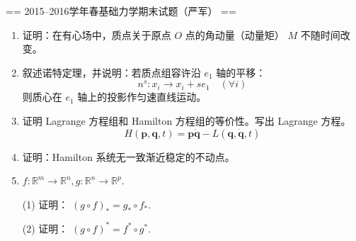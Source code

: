 == 2015--2016学年春基础力学期末试题（严军） ==

\begin{enumerate}
\item 证明：在有心场中，质点关于原点 $O$ 点的角动量（动量矩） $M$ 不随时间改变。

\item 叙述诺特定理，并说明：若质点组容许沿 $e_{1}$ 轴的平移：
\[
    n^s: x_i \to x_i + se_{1} \quad (\forall i)
\]
则质心在 $e_1$ 轴上的投影作匀速直线运动。

\item 证明 Lagrange 方程组和 Hamilton 方程组的等价性。写出 Lagrange 方程。
\[
    H(\boldsymbol{p},\boldsymbol{q},t)=\boldsymbol{p}\dot{\boldsymbol{q}}
    -L(\boldsymbol{q},\dot{\boldsymbol{q}},t)
\]

\item 证明：Hamilton 系统无一致渐近稳定的不动点。

\item $f: \mathbb{R}^m \to \mathbb{R}^n, g: \mathbb{R}^n \to \mathbb{R}^p.$

(1) 证明： $(g \circ f)_{*} = g_{*} \circ f_{*}$.

(2) 证明： $(g \circ f)^{*} = f^{*} \circ g^{*}.$
\end{enumerate}